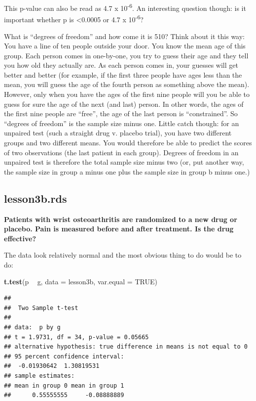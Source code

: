 \documentclass[]{book}
\newenvironment{Shaded}{\begin{snugshade}}{\end{snugshade}}
\newcommand{\DataTypeTok}[1]{\textcolor[rgb]{0.13,0.29,0.53}{#1}}
\newcommand{\KeywordTok}[1]{\textcolor[rgb]{0.13,0.29,0.53}{\textbf{#1}}}
\newcommand{\NormalTok}[1]{#1}
\newcommand{\OperatorTok}[1]{\textcolor[rgb]{0.81,0.36,0.00}{\textbf{#1}}}
\newcommand{\OtherTok}[1]{\textcolor[rgb]{0.56,0.35,0.01}{#1}}
\newcommand{\StringTok}[1]{\textcolor[rgb]{0.31,0.60,0.02}{#1}}
\begin{document}
This p-value can also be read as 4.7 x 10\textsuperscript{-6}. An interesting question though: is it important whether p is \textless0.0005 or 4.7 x 10\textsuperscript{-6}?

What is ``degrees of freedom'' and how come it is 510? Think about it this way: You have a line of ten people outside your door. You know the mean age of this group. Each person comes in one-by-one, you try to guess their age and they tell you how old they actually are. As each person comes in, your guesses will get better and better (for example, if the first three people have ages less than the mean, you will guess the age of the fourth person as something above the mean). However, only when you have the ages of the first nine people will you be able to guess for sure the age of the next (and last) person. In other words, the ages of the first nine people are ``free'', the age of the last person is ``constrained''. So ``degrees of freedom'' is the sample size minus one. Little catch though: for an unpaired test (such a straight drug v. placebo trial), you have two different groups and two different means. You would therefore be able to predict the scores of two observations (the last patient in each group). Degrees of freedom in an unpaired test is therefore the total sample size minus two (or, put another way, the sample size in group a minus one plus the sample size in group b minus one.)

\hypertarget{lesson3b.rds}{%
\subsection{lesson3b.rds}\label{lesson3b.rds}}

\textbf{Patients with wrist osteoarthritis are randomized to a new drug or placebo. Pain is measured before and after treatment. Is the drug effective?}

The data look relatively normal and the most obvious thing to do would be to do:

\begin{Shaded}
\begin{Highlighting}[]
\KeywordTok{t.test}\NormalTok{(p }\OperatorTok{~}\StringTok{ }\NormalTok{g, }\DataTypeTok{data =}\NormalTok{ lesson3b, }\DataTypeTok{var.equal =} \OtherTok{TRUE}\NormalTok{)}
\end{Highlighting}
\end{Shaded}

\begin{verbatim}
## 
##  Two Sample t-test
## 
## data:  p by g
## t = 1.9731, df = 34, p-value = 0.05665
## alternative hypothesis: true difference in means is not equal to 0
## 95 percent confidence interval:
##  -0.01930642  1.30819531
## sample estimates:
## mean in group 0 mean in group 1 
##      0.55555555     -0.08888889
\end{verbatim}
\end{document}

